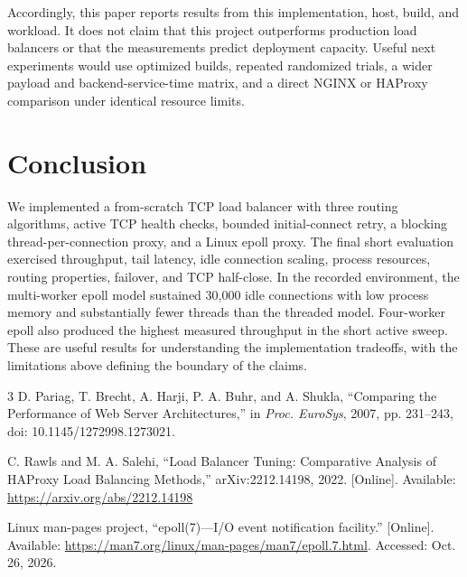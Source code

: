 \documentclass[conference]{IEEEtran}
\begin{document}
Accordingly, this paper reports results from this implementation, host, build, and workload. It does not claim that this project outperforms production load balancers or that the measurements predict deployment capacity. Useful next experiments would use optimized builds, repeated randomized trials, a wider payload and backend-service-time matrix, and a direct NGINX or HAProxy comparison under identical resource limits.

\section{Conclusion}
We implemented a from-scratch TCP load balancer with three routing algorithms, active TCP health checks, bounded initial-connect retry, a blocking thread-per-connection proxy, and a Linux epoll proxy. The final short evaluation exercised throughput, tail latency, idle connection scaling, process resources, routing properties, failover, and TCP half-close. In the recorded environment, the multi-worker epoll model sustained 30,000 idle connections with low process memory and substantially fewer threads than the threaded model. Four-worker epoll also produced the highest measured throughput in the short active sweep. These are useful results for understanding the implementation tradeoffs, with the limitations above defining the boundary of the claims.

\balance
\begin{thebibliography}{3}
D. Pariag, T. Brecht, A. Harji, P. A. Buhr, and A. Shukla, ``Comparing the Performance of Web Server Architectures,'' in \emph{Proc. EuroSys}, 2007, pp. 231--243, doi: 10.1145/1272998.1273021.

C. Rawls and M. A. Salehi, ``Load Balancer Tuning: Comparative Analysis of HAProxy Load Balancing Methods,'' arXiv:2212.14198, 2022. [Online]. Available: \url{https://arxiv.org/abs/2212.14198}

Linux man-pages project, ``epoll(7)---I/O event notification facility.'' [Online]. Available: \url{https://man7.org/linux/man-pages/man7/epoll.7.html}. Accessed: Oct. 26, 2026.
\end{thebibliography}
\end{document}
